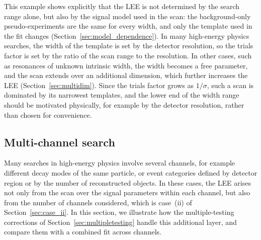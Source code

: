 This example shows explicitly that the LEE is not determined by the search range alone, but also by the signal model used in the scan: the background-only pseudo-experiments are the same for every width, and only the template used in the fit changes (Section~\ref{sec:model_dependence}). In many high-energy physics searches, the width of the template is set by the detector resolution, so the trials factor is set by the ratio of the scan range to the resolution.
In other cases, such as resonances of unknown intrinsic width, the width becomes a free parameter, and the scan extends over an additional dimension, which further increases the LEE (Section~\ref{sec:multidim}). Since the trials factor grows as $1/\sigma$, such a scan is dominated by its narrowest templates, and the lower end of the width range should be motivated physically, for example by the detector resolution, rather than chosen for convenience.

\subsection{Multi-channel search}\label{subsec:exp2}
Many searches in high-energy physics involve several channels, for example different decay modes of the same particle, or event categories defined by detector region or by the number of reconstructed objects. In these cases, the LEE arises not only from the scan over the signal parameters within each channel, but also from the number of channels considered, which is case~(ii) of Section~\ref{sec:case_ii}. In this section, we illustrate how the multiple-testing corrections of Section~\ref{sec:multipletesting} handle this additional layer, and compare them with a combined fit across channels.

